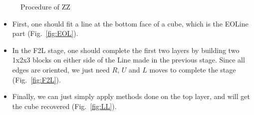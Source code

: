 \documentclass[12pt, a4paper]{article}
\begin{document}
\begin{figure}[!htb]
    \centering
    \hspace{1cm}
    \hspace{1cm}
    \caption{Procedure of ZZ \cite{ZZ}}
    \label{fig:ZZ}
\end{figure}

\begin{itemize}
    \item First, one should fit a line at the bottom face of a cube, which is the EOLine part (Fig.~\ref{fig:EOL}).
    \item In the F2L stage, one should complete the first two layers by building two 1x2x3 blocks on either side of the Line made in the previous stage. 
          Since all edges are oriented, we just need $R$, $U$ and $L$ moves to complete the stage (Fig.~\ref{fig:F2L}).
    \item Finally, we can just simply apply methods done on the top layer, and will get the cube recovered (Fig.~\ref{fig:LL}).
\end{itemize}
\end{document}
